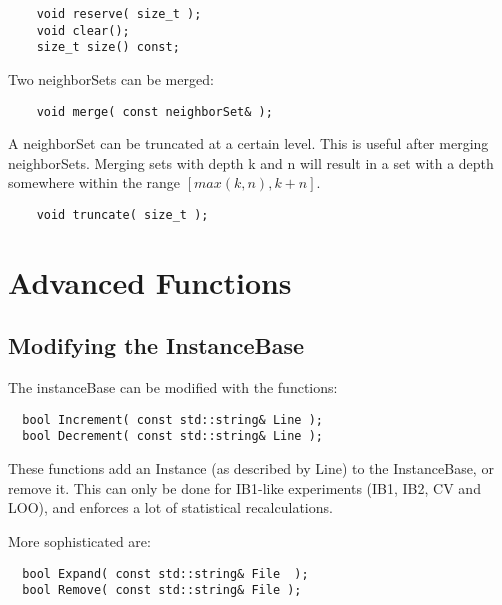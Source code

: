 \documentclass{report}
\begin{document}
\begin{footnotesize}
\begin{verbatim}
    void reserve( size_t );
    void clear();
    size_t size() const;
\end{verbatim}
\end{footnotesize}

Two neighborSets can be merged:

\begin{footnotesize}
\begin{verbatim}
    void merge( const neighborSet& );
\end{verbatim}
\end{footnotesize}

A neighborSet can be truncated at a certain level. This is useful
after merging neighborSets. Merging sets with depth k and n will
result in a set with a depth somewhere within the range $[max(k,n), k+n]$.

\begin{footnotesize}
\begin{verbatim}
    void truncate( size_t );
\end{verbatim}
\end{footnotesize}

\chapter{Advanced Functions}

\section{Modifying the InstanceBase}

The instanceBase can be modified with the functions:

\begin{footnotesize}
\begin{verbatim}
  bool Increment( const std::string& Line ); 
  bool Decrement( const std::string& Line ); 
\end{verbatim}
\end{footnotesize}

These functions add an Instance (as described by Line) to the
InstanceBase, or remove it.  This can only be done for IB1-like
experiments (IB1, IB2, CV and LOO), and enforces a lot of
statistical recalculations.

More sophisticated are:

\begin{footnotesize}
\begin{verbatim}
  bool Expand( const std::string& File  );
  bool Remove( const std::string& File );
\end{verbatim}
\end{footnotesize}
\end{document}
